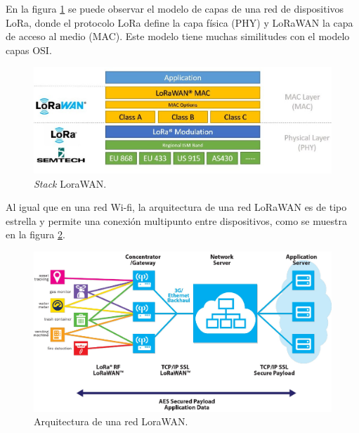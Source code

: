 En la figura \ref{fig:lorawanStack} se puede observar el modelo de capas de una red de dispositivos LoRa, donde el protocolo LoRa define la capa física (PHY) y LoRaWAN la capa de acceso al medio (MAC). Este modelo tiene muchas similitudes con el modelo capas OSI.

\begin{figure}[h]
	\centering
	\includegraphics[scale=0.35]{./Figures/lorawan.jpg}
	\caption{\textit{Stack} LoraWAN\protect\footnotemark.}
	\label{fig:lorawanStack}
\end{figure}


Al igual que en una red Wi-fi, la arquitectura de una red LoRaWAN es de tipo estrella y permite una conexión multipunto entre dispositivos, como se muestra en la figura \ref{fig:lorawanArch}.

\begin{figure}[h]
	\centering
	\includegraphics[scale=0.5]{./Figures/lorawan_architecture.pdf}
	\caption{Arquitectura de una red LoraWAN\protect\footnotemark.}
	\label{fig:lorawanArch}
\end{figure}


